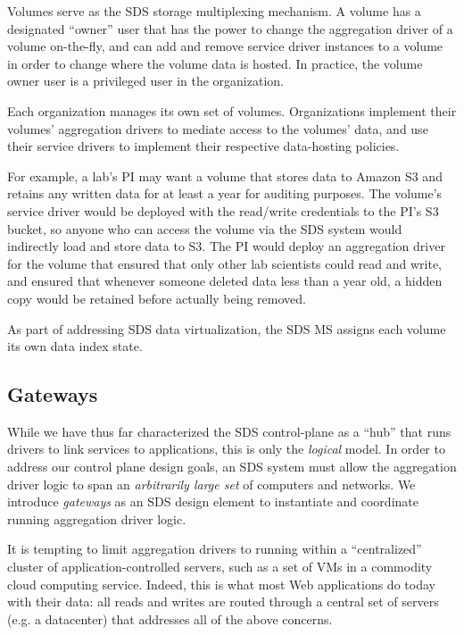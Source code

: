 Volumes serve as the SDS storage multiplexing mechanism.
A volume has a designated ``owner'' user that has the power to
change the aggregation driver of a volume on-the-fly, and can add and remove
service driver instances to a volume in order to change where the volume data is
hosted.  In practice, the volume owner user is a privileged
user in the organization.

Each organization manages its own set of volumes.  Organizations implement their
volumes' aggregation drivers to mediate access to the volumes' data,
and use their service drivers to implement
their respective data-hosting policies.

For example, a lab's PI may want a volume that stores data to Amazon S3 and
retains any written data for at least a year for auditing purposes.  The
volume's service driver would be deployed with the read/write credentials to the
PI's S3 bucket, so anyone who can access the volume via the SDS system would indirectly load and
store data to S3.  The PI would deploy an aggregation driver for the volume that
ensured that only other lab scientists could read and write, and ensured
that whenever someone deleted data less than a year old, a hidden copy would be retained
before actually being removed.

As part of addressing SDS data virtualization, the SDS MS assigns each volume 
its own data index state.

\subsection{Gateways}

While we have thus far characterized the SDS control-plane as a ``hub'' that
runs drivers to link services to applications, this is only the \emph{logical} model.
In order to address our control plane design goals, an SDS system must
allow the aggregation driver logic to
span an \emph{arbitrarily large set} of computers and networks.  We introduce
\emph{gateways} as an SDS design element to instantiate and coordinate running
aggregation driver logic.

It is tempting to limit aggregation drivers to
running within a ``centralized'' cluster of application-controlled servers,
such as a set of VMs in a commodity cloud computing service.  Indeed, this is
what most Web applications do today with their data:  all reads and writes are routed through a
central set of servers (e.g. a datacenter) that addresses all of the above
concerns.

